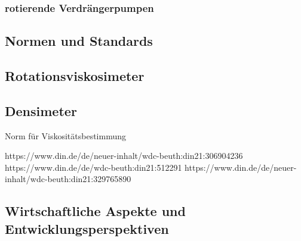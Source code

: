 \subsubsection{rotierende Verdrängerpumpen}

\subsection{Normen und Standards}

\subsection{Rotationsviskosimeter}
\subsection{Densimeter}

Norm für Viskositätsbestimmung

https://www.din.de/de/neuer-inhalt/wdc-beuth:din21:306904236
https://www.din.de/de/wdc-beuth:din21:512291
https://www.din.de/de/neuer-inhalt/wdc-beuth:din21:329765890

\subsection{Wirtschaftliche Aspekte und Entwicklungsperspektiven}
